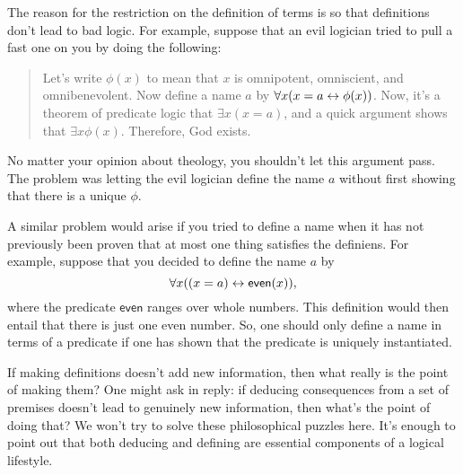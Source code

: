 The reason for the restriction on the definition of terms is so that
definitions don't lead to bad logic.  For example, suppose that an
evil logician tried to pull a fast one on you by doing the following:
\begin{quote} Let's write $\phi (x)$ to mean that $x$ is omnipotent,
  omniscient, and omnibenevolent.  Now define a name $a$ by
  $\forall x(x=a \leftrightarrow \phi (x))$.  Now, it's a theorem of predicate
  logic that $\exists x(x=a)$, and a quick argument shows that
  $\exists x\phi (x)$.  Therefore, God exists.  \end{quote} No matter
your opinion about theology, you shouldn't let this argument pass.
The problem was letting the evil logician define the name $a$ without
first showing that there is a unique $\phi$.

A similar problem would arise if you tried to define a name when it
has not previously been proven that at most one thing satisfies the
definiens.  For example, suppose that you decided to define the name
$a$ by
\[ \forall x((x=a)\leftrightarrow \mathsf{even}(x)) ,\] where the predicate
$\mathsf{even}$ ranges over whole numbers.  This definition would then
entail that there is just one even number.  So, one should only define
a name in terms of a predicate if one has shown that the predicate is
uniquely instantiated.

If making definitions doesn't add new information, then what really is
the point of making them?  One might ask in reply: if deducing
consequences from a set of premises doesn't lead to genuinely new
information, then what's the point of doing that?  We won't try to
solve these philosophical puzzles here.  It's enough to point out that
both deducing and defining are essential components of a logical
lifestyle.


